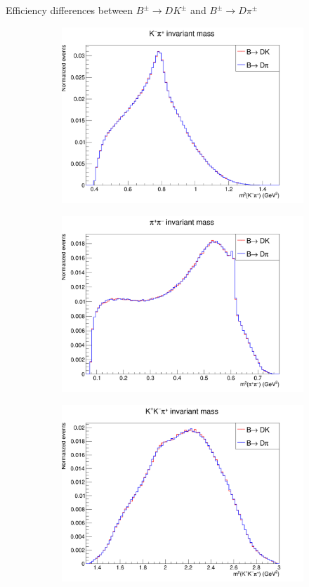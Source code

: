 \documentclass{beamer}
\begin{document}
\begin{frame}{Efficiency differences between $B^\pm\to DK^\pm$ and $B^\pm\to D\pi^\pm$}
\begin{figure}
\begin{subfigure}{0.33\textwidth}
      \includegraphics[width = 1.0\textwidth]{Plots/Dalitz_s12.png}
    \end{subfigure}
    \begin{subfigure}{0.33\textwidth}
      \includegraphics[width = 1.0\textwidth]{Plots/Dalitz_s23.png}
    \end{subfigure}%
    \begin{subfigure}{0.33\textwidth}
      \includegraphics[width = 1.0\textwidth]{Plots/Dalitz_s012.png}

\end{subfigure}
\end{figure}
\end{frame}
\end{document}
